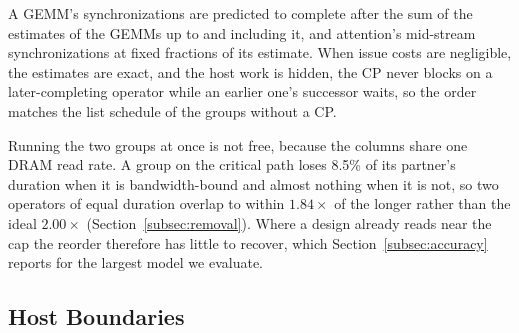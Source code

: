 A GEMM's synchronizations are predicted to complete after the sum of the estimates of the GEMMs up to and including it, and attention's mid-stream synchronizations at fixed fractions of its estimate.
When issue costs are negligible, the estimates are exact, and the host work is hidden, the CP never blocks on a later-completing operator while an earlier one's successor waits, so the order matches the list schedule of the groups without a CP.

Running the two groups at once is not free, because the columns share one DRAM read rate.
A group on the critical path loses 8.5\% of its partner's duration when it is bandwidth-bound and almost nothing when it is not, so two operators of equal duration overlap to within $1.84\times$ of the longer rather than the ideal $2.00\times$ (Section~\ref{subsec:removal}).
Where a design already reads near the cap the reorder therefore has little to recover, which Section~\ref{subsec:accuracy} reports for the largest model we evaluate.

\subsection{Host Boundaries}
\label{app:host}

